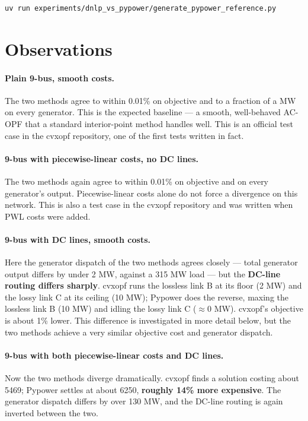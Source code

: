 \documentclass[11pt]{article}
\begin{document}
\begin{verbatim}
uv run experiments/dnlp_vs_pypower/generate_pypower_reference.py
\end{verbatim}

\section{Observations}

\paragraph{Plain 9-bus, smooth costs.} The two methods agree to within 0.01\% on
objective and to a fraction of a MW on every generator. This is the expected
baseline --- a smooth, well-behaved AC-OPF that a standard interior-point method
handles well. This is an official test case in the cvxopf repository, one of the
first tests written in fact.

\paragraph{9-bus with piecewise-linear costs, no DC lines.} The two methods
again agree to within 0.01\% on objective and on every generator's output.
Piecewise-linear costs alone do not force a divergence on this network. This is
also a test case in the cvxopf repository and was written when PWL costs were
added.

\paragraph{9-bus with DC lines, smooth costs.} Here the generator dispatch of
the two methods agrees closely --- total generator output differs by under 2 MW,
against a 315 MW load --- but the \textbf{DC-line routing differs sharply}.
cvxopf runs the lossless link B at its floor (2 MW) and the lossy link C at its
ceiling (10 MW); Pypower does the reverse, maxing the lossless link B (10 MW)
and idling the lossy link C ($\approx 0$ MW). cvxopf's objective is about 1\%
lower. This difference is investigated in more detail below, but the two methods
achieve a very similar objective cost and generator dispatch.

\paragraph{9-bus with both piecewise-linear costs and DC lines.} Now the two
methods diverge dramatically. cvxopf finds a solution costing about 5469;
Pypower settles at about 6250, \textbf{roughly 14\% more expensive}. The
generator dispatch differs by over 130 MW, and the DC-line routing is again
inverted between the two.
\end{document}
